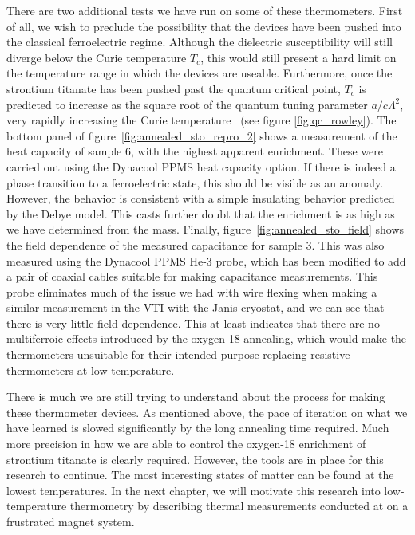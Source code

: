 \documentclass{thesis-umich}
\begin{document}
There are two additional tests we have run on some of these thermometers. First of all, we wish to preclude the possibility that the devices have been pushed into the classical ferroelectric regime. Although the dielectric susceptibility will still diverge below the Curie temperature $T_c$, this would still present a hard limit on the temperature range in which the devices are useable. Furthermore, once the strontium titanate has been pushed past the quantum critical point, $T_c$ is predicted to increase as the square root of the quantum tuning parameter $a/c\Lambda^2$, very rapidly increasing the Curie temperature~\cite{RowleyThesis} (see figure \ref{fig:qc_rowley}). The bottom panel of figure~\ref{fig:annealed_sto_repro_2} shows a measurement of the heat capacity of sample 6, with the highest apparent enrichment. These were carried out using the Dynacool PPMS heat capacity option. If there is indeed a phase transition to a ferroelectric state, this should be visible as an anomaly. However, the behavior is consistent with a simple insulating behavior predicted by the Debye model. This casts further doubt that the enrichment is as high as we have determined from the mass. Finally, figure~\ref{fig:annealed_sto_field} shows the field dependence of the measured capacitance for sample 3. This was also measured using the Dynacool PPMS He-3 probe, which has been modified to add a pair of coaxial cables suitable for making capacitance measurements. This probe eliminates much of the issue we had with wire flexing when making a similar measurement in the VTI with the Janis cryostat, and we can see that there is very little field dependence. This at least indicates that there are no multiferroic effects introduced by the oxygen-18 annealing, which would make the thermometers unsuitable for their intended purpose replacing resistive thermometers at low temperature.

There is much we are still trying to understand about the process for making these thermometer devices. As mentioned above, the pace of iteration on what we have learned is slowed significantly by the long annealing time required. Much more precision in how we are able to control the oxygen-18 enrichment of strontium titanate is clearly required. However, the tools are in place for this research to continue. The most interesting states of matter can be found at the lowest temperatures. In the next chapter, we will motivate this research into low-temperature thermometry by describing thermal measurements conducted at on a frustrated magnet system.  
\end{document}
